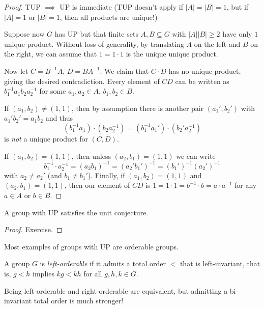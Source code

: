 \begin{proof}
    TUP $\implies$ UP is immediate (TUP doesn't apply if $|A| = |B| = 1$, but if $|A| = 1$ or $|B| = 1$, then all products are unique!)

    Suppose now $G$ has UP but that finite sets $A, B \subseteq G$ with $|A| |B| \geq 2$ have only $1$ unique product.
    Without loss of generality, by translating $A$ on the left and $B$ on the right, we can assume that $1 = 1 \cdot 1$ is the unique unique product.

    Now let $C = B^{-1} A$, $D = B A^{-1}$.
    We claim that $C \cdot D$ has no unique product, giving the desired contradiction.
    Every element of $CD$ can be written as $b_1^{-1} a_1 b_2 a_2^{-1}$ for some $a_1, a_2 \in A$, $b_1, b_2 \in B$.

    If $(a_1, b_2) \neq (1, 1)$, then by assumption there is another pair $(a_1', b_2')$ with $a_1' b_2' = a_1 b_2$ and thus \[
        (b_1^{-1} a_1) \cdot (b_2 a_2^{-1}) = (b_1^{-1} a_1') \cdot (b_2' a_2^{-1})
    \] is \emph{not} a unique product for $(C, D)$.

    If $(a_1, b_2) = (1, 1)$, then unless $(a_2, b_1) = (1, 1)$ we can write \[
        b_1^{-1} \cdot a_2^{-1} = (a_2 b_1)^{-1} = (a_2' b_1')^{-1} = (b_1')^{-1} (a_2')^{-1}
    \]
    with $a_2 \neq a_2'$ (and $b_1 \neq b_1'$).
    Finally, if $(a_1, b_2) = (1, 1)$ and $(a_2, b_1) = (1, 1)$, then our element of $CD$ is $1 = 1 \cdot 1 = b^{-1} \cdot b = a \cdot a^{-1}$ for any $a \in A$ or $b \in B$.
\end{proof}

\begin{corollary}
    \label{corollary:UP_implies_unit_conjecture}
    A group with UP satisfies the unit conjecture.
\end{corollary}

\begin{proof}
    Exercise.
\end{proof}

Most examples of groups with UP are orderable groups.

\begin{definition}
    A group $G$ is \emph{left-orderable} if it admits a total order $<$ that is left-invariant, that is, $g < h$ implies $kg < kh$ for all $g, h, k \in G$.
\end{definition}

\begin{remark}
    Being left-orderable and right-orderable are equivalent, but admitting a bi-invariant total order is much stronger!
\end{remark}

